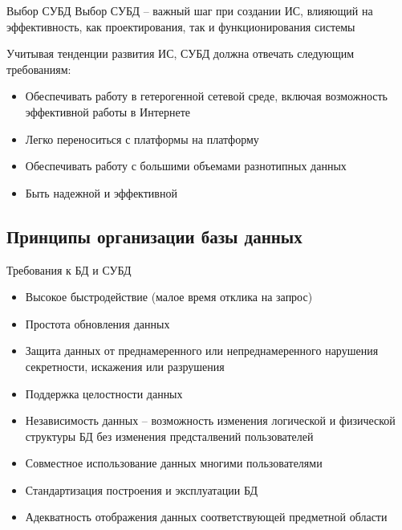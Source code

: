 \documentclass[12pt]{article}
\begin{document}
\begin{nota}{Выбор СУБД}
    Выбор СУБД -- важный шаг при создании ИС, влияющий на эффективность, как проектирования, так и функционирования системы

    Учитывая тенденции развития ИС, СУБД должна отвечать следующим требованиям:

    \begin{itemize}
        \item Обеспечивать работу в гетерогенной сетевой среде, включая возможность эффективной работы в Интернете
        \item Легко переноситься с платформы на платформу
        \item Обеспечивать работу с большими объемами разнотипных данных
        \item Быть надежной и эффективной
    \end{itemize}
\end{nota}

\newpage

\subsection{Принципы организации базы данных}

\begin{nota}{Требования к БД и СУБД}
    \begin{itemize}
        \item Высокое быстродействие (малое время отклика на запрос)
        \item Простота обновления данных
        \item Защита данных от преднамеренного или непреднамеренного нарушения секретности, искажения или разрушения
        \item Поддержка целостности данных
        \item Независимость данных -- возможность изменения логической и физической структуры БД без изменения предсталвений пользователей
        \item Совместное использование данных многими пользователями
        \item Стандартизация построения и эксплуатации БД
        \item Адекватность отображения данных соответствующей предметной области 
    \end{itemize}
\end{nota}
\end{document}
